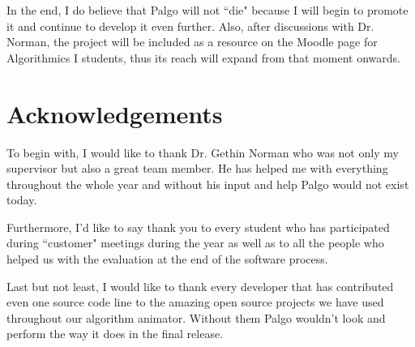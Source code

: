 \documentclass{l4proj}
\begin{document}
In the end, I do believe that Palgo will not ``die" because I will begin to promote it and continue to develop it even
further. Also, after discussions with Dr. Norman, the project will be included as a resource on the Moodle page for
Algorithmics I students, thus its reach will expand from that moment onwards.

\section{Acknowledgements}

To begin with, I would like to thank Dr. Gethin Norman who was not only my supervisor but also a great team member. He
has helped me with everything throughout the whole year and without his input and help Palgo would not exist today.

Furthermore, I'd like to say thank you to every student who has participated during ``customer" meetings during the year
as well as to all the people who helped us with the evaluation at the end of the software process.

Last but not least, I would like to thank every developer that has contributed even one source code line to the amazing open source projects
we have used throughout our algorithm animator. Without them Palgo wouldn't look and perform the way it does in
the final release.


\appendix



\end{document}

